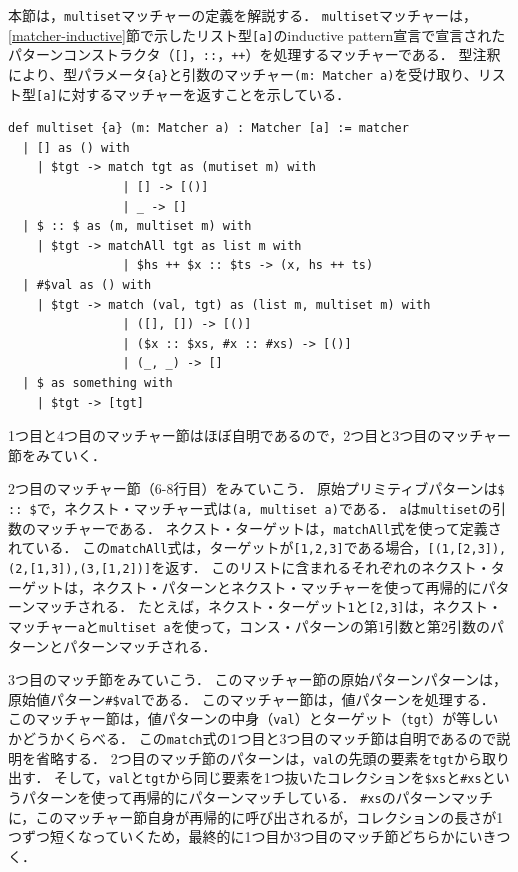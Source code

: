 本節は，\lstinline{multiset}マッチャーの定義を解説する．
\lstinline{multiset}マッチャーは，\ref{matcher-inductive}節で示したリスト型\lstinline{[a]}のinductive pattern宣言で宣言されたパターンコンストラクタ（\lstinline{[]}，\lstinline{::}，\lstinline{++}）を処理するマッチャーである．
型注釈により、型パラメータ\lstinline|{a}|と引数のマッチャー\lstinline|(m: Matcher a)|を受け取り、リスト型\lstinline|[a]|に対するマッチャーを返すことを示している．
\begin{lstlisting}[language=egison]
def multiset {a} (m: Matcher a) : Matcher [a] := matcher
  | [] as () with
    | $tgt -> match tgt as (mutiset m) with
                | [] -> [()]
                | _ -> []
  | $ :: $ as (m, multiset m) with
    | $tgt -> matchAll tgt as list m with
                | $hs ++ $x :: $ts -> (x, hs ++ ts)
  | #$val as () with
    | $tgt -> match (val, tgt) as (list m, multiset m) with
                | ([], []) -> [()]
                | ($x :: $xs, #x :: #xs) -> [()]
                | (_, _) -> []
  | $ as something with
    | $tgt -> [tgt]
\end{lstlisting}
1つ目と4つ目のマッチャー節はほぼ自明であるので，2つ目と3つ目のマッチャー節をみていく．

2つ目のマッチャー節（6-8行目）をみていこう．
原始プリミティブパターンは\lstinline{$ :: $}で，ネクスト・マッチャー式は\lstinline{(a, multiset a)}である．
\lstinline{a}は\lstinline{multiset}の引数のマッチャーである．
ネクスト・ターゲットは，\lstinline{matchAll}式を使って定義されている．
この\lstinline{matchAll}式は，ターゲットが\lstinline{[1,2,3]}である場合，\lstinline{[(1,[2,3]),(2,[1,3]),(3,[1,2])]}を返す．
このリストに含まれるそれぞれのネクスト・ターゲットは，ネクスト・パターンとネクスト・マッチャーを使って再帰的にパターンマッチされる．
たとえば，ネクスト・ターゲット\lstinline{1}と\lstinline{[2,3]}は，ネクスト・マッチャー\lstinline{a}と\lstinline{multiset a}を使って，コンス・パターンの第1引数と第2引数のパターンとパターンマッチされる．

3つ目のマッチ節をみていこう．
このマッチャー節の原始パターンパターンは，原始値パターン\lstinline|#$val|である．
このマッチャー節は，値パターンを処理する．
このマッチャー節は，値パターンの中身（\lstinline{val}）とターゲット（\lstinline{tgt}）が等しいかどうかくらべる．
この\lstinline{match}式の1つ目と3つ目のマッチ節は自明であるので説明を省略する．
2つ目のマッチ節のパターンは，\lstinline{val}の先頭の要素を\lstinline{tgt}から取り出す．
そして，\lstinline{val}と\lstinline{tgt}から同じ要素を1つ抜いたコレクションを\lstinline{$xs}と\lstinline{#xs}というパターンを使って再帰的にパターンマッチしている．
\lstinline{#xs}のパターンマッチに，このマッチャー節自身が再帰的に呼び出されるが，コレクションの長さが1つずつ短くなっていくため，最終的に1つ目か3つ目のマッチ節どちらかにいきつく．

